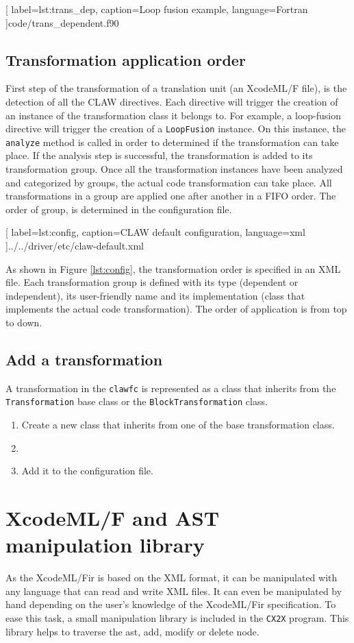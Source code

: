 \documentclass[a4paper, 11pt]{report}
\def\xcodeml{XcodeML/F\xspace}
\def\clawfc{\lstinline!clawfc!\xspace}
\def\cx2x{\lstinline!CX2X!\xspace}
\begin{document}

  [
    label=lst:trans_dep, 
    caption=Loop fusion example, 
    language=Fortran
  ]{code/trans_dependent.f90}

\section{Transformation application order}
First step of the transformation of a translation unit (an XcodeML/F file), 
is the detection of all the CLAW directives. Each directive will trigger the 
creation of an instance of the transformation class it belongs to. For example,
a loop-fusion directive will trigger the creation of a \lstinline|LoopFusion| 
instance. On this instance, the \lstinline|analyze| method is called in order 
to determined if the transformation can take place. If the analysis step is 
successful, the transformation is added to its transformation group. 
Once all the transformation instances have been analyzed and categorized by 
groups, the actual code transformation can take place. All transformations 
in a group are applied one after another in a FIFO order. The order of group, 
is determined in the configuration file. 


  [
    label=lst:config, 
    caption=CLAW default configuration, 
    language=xml
  ]{../../driver/etc/claw-default.xml}

As shown in Figure \ref{lst:config}, the transformation order is specified in 
an XML file. Each transformation group is defined with its type (dependent or 
independent), its user-friendly name and its implementation (class that 
implements the actual code transformation). The order of application is from 
top to down.


\section{Add a transformation}
A transformation in the \clawfc is represented as a class that inherits from 
the \lstinline|Transformation| base class or the 
\lstinline|BlockTransformation| class.

\begin{enumerate}
\item Create a new class that inherits from one of the base transformation 
class.
\item %
\item Add it to the configuration file.
\end{enumerate}

\chapter{\xcodeml and AST manipulation library}
\label{chapter:astmanip}
As the \xcodeml \gls{ir} is based on the XML format, it can be manipulated with
any language that can read and write XML files. It can even be manipulated by 
hand depending on the user's knowledge of the \xcodeml \gls{ir} specification. 
To ease this task, a small manipulation library is included in the \cx2x 
program. This library helps to traverse the \gls{ast}, add, modify or delete 
node.
\end{document}
